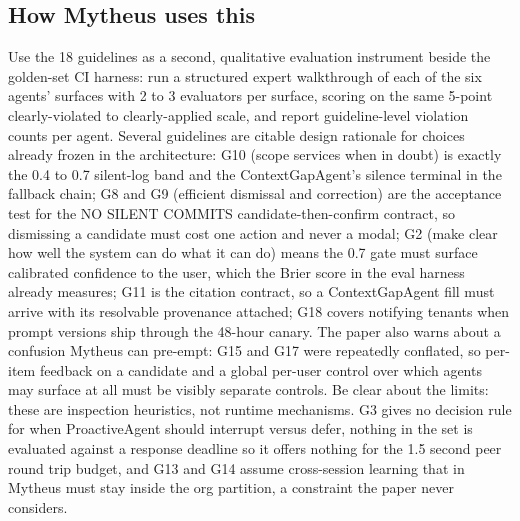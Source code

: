 \subsection{How Mytheus uses this}
\begin{takeaway}
Use the 18 guidelines as a second, qualitative evaluation instrument beside the golden-set CI harness: run a structured expert walkthrough of each of the six agents' surfaces with 2 to 3 evaluators per surface, scoring on the same 5-point clearly-violated to clearly-applied scale, and report guideline-level violation counts per agent. Several guidelines are citable design rationale for choices already frozen in the architecture: G10 (scope services when in doubt) is exactly the 0.4 to 0.7 silent-log band and the ContextGapAgent's silence terminal in the fallback chain; G8 and G9 (efficient dismissal and correction) are the acceptance test for the NO SILENT COMMITS candidate-then-confirm contract, so dismissing a candidate must cost one action and never a modal; G2 (make clear how well the system can do what it can do) means the 0.7 gate must surface calibrated confidence to the user, which the Brier score in the eval harness already measures; G11 is the citation contract, so a ContextGapAgent fill must arrive with its resolvable provenance attached; G18 covers notifying tenants when prompt versions ship through the 48-hour canary. The paper also warns about a confusion Mytheus can pre-empt: G15 and G17 were repeatedly conflated, so per-item feedback on a candidate and a global per-user control over which agents may surface at all must be visibly separate controls. Be clear about the limits: these are inspection heuristics, not runtime mechanisms. G3 gives no decision rule for when ProactiveAgent should interrupt versus defer, nothing in the set is evaluated against a response deadline so it offers nothing for the 1.5 second peer round trip budget, and G13 and G14 assume cross-session learning that in Mytheus must stay inside the org partition, a constraint the paper never considers.
\end{takeaway}

